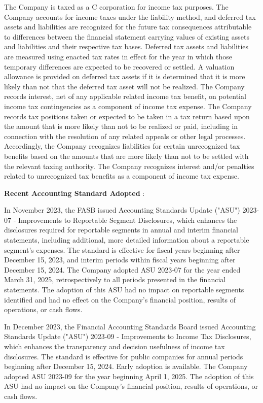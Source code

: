 \documentclass[11pt,a4paper]{article}
\begin{document}
The Company is taxed as a C corporation for income tax purposes. The Company accounts for income taxes under the liability method, and deferred tax assets and liabilities are recognized for the future tax consequences attributable to differences between the financial statement carrying values of existing assets and liabilities and their respective tax bases. Deferred tax assets and liabilities are measured using enacted tax rates in effect for the year in which those temporary differences are expected to be recovered or settled. A valuation allowance is provided on deferred tax assets if it is determined that it is more likely than not that the deferred tax asset will not be realized. The Company records interest, net of any applicable related income tax benefit, on potential income tax contingencies as a component of income tax expense. The Company records tax positions taken or expected to be taken in a tax return based upon the amount that is more likely than not to be realized or paid, including in connection with the resolution of any related appeals or other legal processes. Accordingly, the Company recognizes liabilities for certain unrecognized tax benefits based on the amounts that are more likely than not to be settled with the relevant taxing authority. The Company recognizes interest and/or penalties related to unrecognized tax benefits as a component of income tax expense.

\textbf{Recent Accounting Standard Adopted} :

In November 2023, the FASB issued Accounting Standards Update ("ASU") 2023-07 - Improvements to Reportable Segment Disclosures, which enhances the disclosures required for reportable segments in annual and interim financial statements, including additional, more detailed information about a reportable segment's expenses. The standard is effective for fiscal years beginning after December 15, 2023, and interim periods within fiscal years beginning after December 15, 2024. The Company adopted ASU 2023-07 for the year ended March 31, 2025, retrospectively to all periods presented in the financial statements. The adoption of this ASU had no impact on reportable segments identified and had no effect on the Company's financial position, results of operations, or cash flows.

In December 2023, the Financial Accounting Standards Board issued Accounting Standards Update ("ASU") 2023-09 - Improvements to Income Tax Disclosures, which enhances the transparency and decision usefulness of income tax disclosures. The standard is effective for public companies for annual periods beginning after December 15, 2024. Early adoption is available. The Company adopted ASU 2023-09 for the year beginning April 1, 2025. The adoption of this ASU had no impact on the Company's financial position, results of operations, or cash flows.
\end{document}
